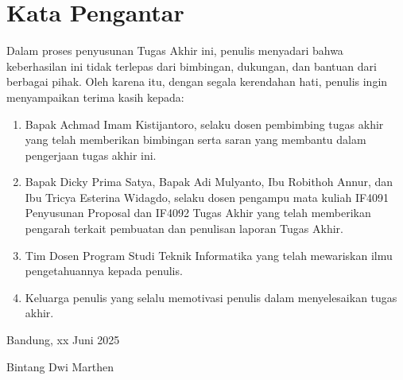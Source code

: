 \chapter*{Kata Pengantar}

Dalam proses penyusunan Tugas Akhir ini, penulis menyadari bahwa keberhasilan ini tidak terlepas dari bimbingan, dukungan, dan bantuan dari berbagai pihak. Oleh karena itu, dengan segala kerendahan hati, penulis ingin menyampaikan terima kasih kepada:
\begin{enumerate}
    \item Bapak Achmad Imam Kistijantoro, selaku dosen pembimbing tugas akhir yang telah memberikan bimbingan serta saran yang membantu dalam pengerjaan tugas akhir ini.
    \item Bapak Dicky Prima Satya, Bapak Adi Mulyanto, Ibu Robithoh Annur, dan Ibu Tricya Esterina Widagdo, selaku dosen pengampu mata kuliah IF4091 Penyusunan Proposal dan IF4092 Tugas Akhir yang telah memberikan pengarah terkait pembuatan dan penulisan laporan Tugas Akhir.
    \item Tim Dosen Program Studi Teknik Informatika yang telah mewariskan ilmu pengetahuannya kepada penulis.
    \item Keluarga penulis yang selalu memotivasi penulis dalam menyelesaikan tugas akhir.
\end{enumerate}

Bandung, xx Juni 2025

Bintang Dwi Marthen

